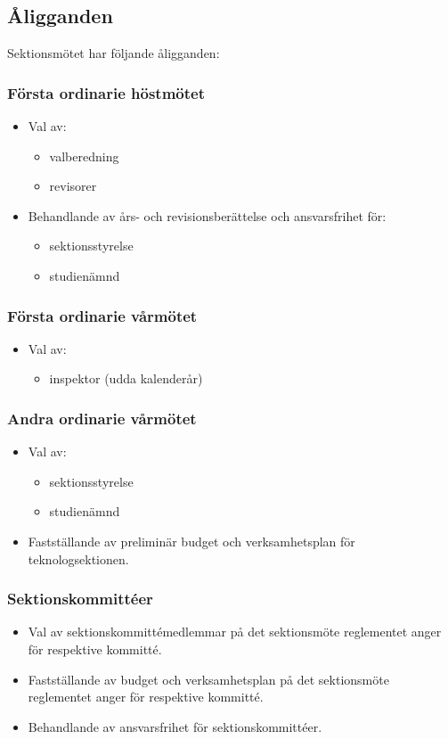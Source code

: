 \subsection{Åligganden}
Sektionsmötet har följande åligganden:
\subsubsection{Första ordinarie höstmötet}
\begin{itemize}
	\item Val av: 
	\begin{itemize}
		\item valberedning
		\item revisorer
	\end{itemize}
	\item Behandlande av års- och revisionsberättelse och ansvarsfrihet för:
	\begin{itemize}
		\item sektionsstyrelse
		\item studienämnd
	\end{itemize}
\end{itemize}
	
\subsubsection{Första ordinarie vårmötet}
\begin{itemize}
	\item Val av: 
	\begin{itemize}
		\item inspektor (udda kalenderår)
	\end{itemize}
\end{itemize}


\subsubsection{Andra ordinarie vårmötet}
\begin{itemize}
	\item Val av:
	\begin{itemize}
		\item sektionsstyrelse
		\item studienämnd
	\end{itemize}
	\item Fastställande av preliminär budget och verksamhetsplan för teknologsektionen.
\end{itemize}

\subsubsection{Sektionskommittéer}
\begin{itemize}
	\item Val av sektionskommittémedlemmar på det sektionsmöte reglementet anger för respektive kommitté. 
	\item Fastställande av budget och verksamhetsplan på det sektionsmöte reglementet anger för respektive kommitté.
	\item Behandlande av ansvarsfrihet för sektionskommittéer.
\end{itemize}

